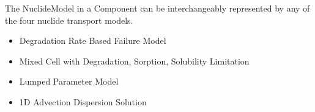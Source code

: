 \begin{frame}
  The NuclideModel in a Component can be interchangeably represented by any of 
  the four nuclide transport models. 
    \begin{itemize}
      \item Degradation Rate Based Failure Model
      \item Mixed Cell with Degradation, Sorption, Solubility Limitation
      \item Lumped Parameter Model
      \item 1D Advection Dispersion Solution
    \end{itemize}
\end{frame}
